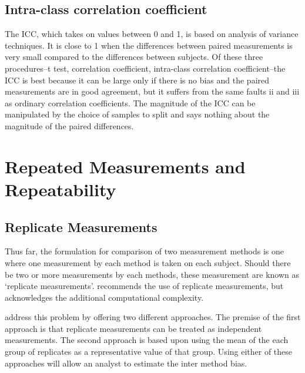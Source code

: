 \documentclass[12pt, a4paper]{report}
\theoremstyle{plain}
\theoremstyle{definition}
\theoremstyle{remark}
\begin{document}
	\section*{Intra-class correlation coefficient}
 
	The ICC, which takes on values between 0 and 1, is based on analysis of variance techniques. It is close to 1 when the differences between paired measurements is very small compared to the differences between subjects. Of these three procedures--t test, correlation coefficient, intra-class correlation coefficient--the ICC is best because it can be large only if there is no bias and the paired measurements are in good agreement, but it suffers from the same faults ii and iii as ordinary correlation coefficients. The magnitude of the ICC can be manipulated by the choice of samples to split and says nothing about the magnitude of the paired differences.


	



\chapter{Repeated Measurements and Repeatability}
	
	
	
	
	\section{Replicate Measurements}
	
	Thus far, the formulation for comparison of two measurement
	methods is one where one measurement by each method is taken on
	each subject. Should there be two or more measurements by each
	methods, these measurement are known as `replicate measurements'.
	\citet{BXC2008} recommends the use of replicate measurements, but
	acknowledges the additional computational complexity.
	
	\citet*{BA86} address this problem by offering two different
	approaches. The premise of the first approach is that replicate
	measurements can be treated as independent measurements. The
	second approach is based upon using the mean of the each group of
	replicates as a representative value of that group. Using either
	of these approaches will allow an analyst to estimate the inter
	method bias.
	
\end{document}
